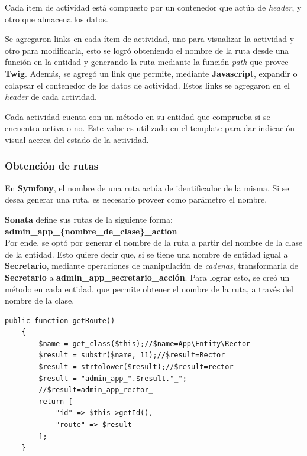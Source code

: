 Cada ítem de actividad está compuesto por un contenedor que actúa de \textit{header}, y otro que almacena los datos\@.




Se agregaron links en cada ítem de actividad, uno para visualizar la actividad y otro para modificarla, esto se logró obteniendo el nombre de la ruta desde una función en la
entidad y generando la ruta mediante la función \textit{path} que provee \textbf{Twig}\@. Además, se agregó un link que permite, mediante \textbf{Javascript}, expandir o colapsar
el contenedor de los datos de actividad\@.  Estos links se agregaron en el \textit{header} de cada actividad\@.

Cada actividad cuenta con un método en su entidad que comprueba si se encuentra activa o no. Este valor es utilizado en el template para dar indicación visual acerca del estado de la actividad\@.

\subsubsection{Obtención de rutas}%
\label{ssub:obtención_de_rutas}
En \textbf{Symfony}, el nombre de una ruta actúa de identificador de la misma\@. Si se desea generar una ruta, es necesario proveer como parámetro el nombre.


\textbf{Sonata} define sus rutas de la siguiente forma: \\

\textbf{admin\_app\_\{nombre\_de\_clase\}\_action} \\

Por ende, se optó por generar el nombre de la ruta a partir del nombre de la clase de la entidad. Esto quiere decir que, si se tiene una nombre de entidad igual a \textbf{Secretario}, mediante
operaciones de
manipulación de \textit{cadenas}, transformarla de \textbf{Secretario} a \textbf{admin\_app\_secretario\_acción}\@.  Para lograr esto, se creó un método en cada entidad, que permite obtener el nombre de
la ruta, a través del nombre de la clase.

\newpage
\begin{lstlisting}[caption={Obtención del nombre de una ruta.\\Fuente: Elaboración propia.}, label={lst:ruta}]
    public function getRoute()
    {
        $name = get_class($this);//$name=App\Entity\Rector
        $result = substr($name, 11);//$result=Rector
        $result = strtolower($result);//$result=rector
        $result = "admin_app_".$result."_";
        //$result=admin_app_rector_
        return [
            "id" => $this->getId(),
            "route" => $result
        ];
    }
\end{lstlisting}

